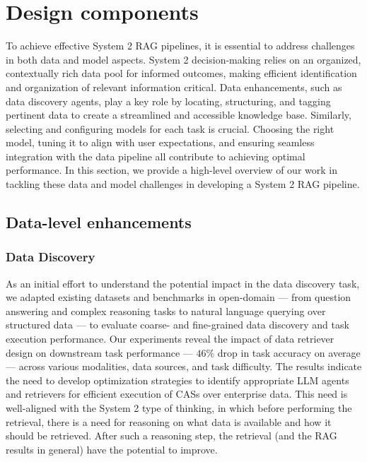 \section{Design components}
\label{sec:sys2}



To achieve effective System 2 RAG pipelines, it is essential to address challenges in both data and model aspects. System 2 decision-making relies on an organized, contextually rich data pool for informed outcomes, making efficient identification and organization of relevant information critical. Data enhancements, such as data discovery agents, play a key role by locating, structuring, and tagging pertinent data to create a streamlined and accessible knowledge base. Similarly, selecting and configuring models for each task is crucial. Choosing the right model, tuning it to align with user expectations, and ensuring seamless integration with the data pipeline all contribute to achieving optimal performance. 
In this section, we provide a high-level overview of our work in tackling these data and model challenges in developing a System 2 RAG pipeline.
\subsection{Data-level enhancements}


\subsubsection{Data Discovery}
As an initial effort to understand the potential impact in the data discovery task, we adapted existing datasets and benchmarks in open-domain --- from question answering and complex reasoning tasks to natural language querying over structured data --- to evaluate coarse- and fine-grained data discovery and task execution performance. Our experiments reveal the impact of data retriever design on downstream task 
  performance --- $46\%$ drop in task accuracy on average ---
  across various modalities, data sources, and task difficulty. The results indicate the need to develop optimization strategies to identify appropriate LLM agents and retrievers for efficient execution of CASs over enterprise data. This need is well-aligned with the System 2 type of thinking, in which before performing the retrieval, there is a need for reasoning on what data is available and how it should be retrieved. After such a reasoning step, the retrieval (and the RAG results in general) have the potential to improve.

